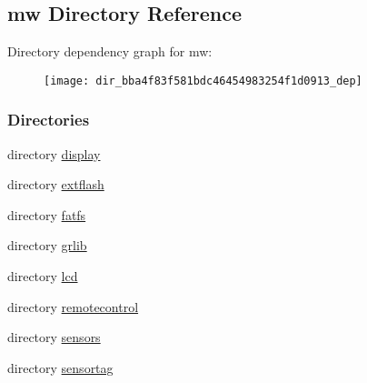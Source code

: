 \subsection{mw Directory Reference}
\label{dir_bba4f83f581bdc46454983254f1d0913}
Directory dependency graph for mw\+:
\nopagebreak
\begin{figure}[H]
\begin{center}
\leavevmode
\texttt{[image: dir\_bba4f83f581bdc46454983254f1d0913\_dep]}
\end{center}
\end{figure}
\subsubsection*{Directories}
\begin{DoxyCompactItemize}
\item 
directory \hyperlink{dir_8225ead4c6b469145b1f14ab46e89e14}{display}
\item 
directory \hyperlink{dir_ba9f69397f4af9507c5cddf0503b47a2}{extflash}
\item 
directory \hyperlink{dir_a626aa4d1b57c38ab308dc078106b6fe}{fatfs}
\item 
directory \hyperlink{dir_d69152ae96e57d68f6209a92f269889f}{grlib}
\item 
directory \hyperlink{dir_10eed97e3b8763618cb66dd7d8e815b2}{lcd}
\item 
directory \hyperlink{dir_b6596ecf510c6f415dcaf7bdab3a6576}{remotecontrol}
\item 
directory \hyperlink{dir_60f528451dee6090ff9c6a8a2988c9f7}{sensors}
\item 
directory \hyperlink{dir_894c66576e02d9efb33a783c7d32a64a}{sensortag}
\end{DoxyCompactItemize}
